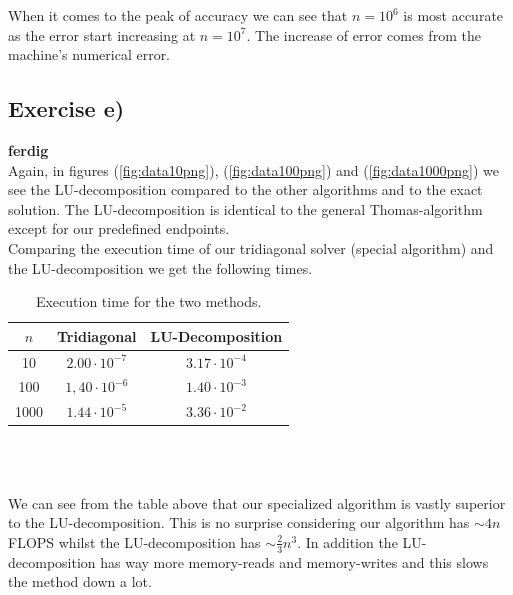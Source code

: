 \documentclass{article}
\begin{document}
  When it comes to the peak of accuracy we can see that $n=10^6$ is most accurate as the error start increasing at $n=10^7$. The increase of error comes from the machine's numerical error.

  \subsection{Exercise e)} \label{sec:Results e)}

  {\bf ferdig} \\

  Again, in figures (\ref{fig:data10png}), (\ref{fig:data100png}) and (\ref{fig:data1000png}) we see the LU-decomposition compared to the other algorithms and to the exact solution. The LU-decomposition is identical to the general Thomas-algorithm except for our predefined endpoints.\\

  Comparing the execution time of our tridiagonal solver (special algorithm) and the LU-decomposition we get the following times. \\

  \newpage

  \begin{table}[ht] \label{tab:exec_time}
    \centering
      \caption{Execution time for the two methods.}
      \vspace{2mm}
      \begin{tabular}{|c|c|c|}
        \hline
        $n$    &   Tridiagonal      &  LU-Decomposition  \\
        \hline \hline
        10   & $2.00\cdot10^{-7}$ & $3.17\cdot10^{-4}$ \\
        100  & $1,40\cdot10^{-6}$ & $1.40\cdot10^{-3}$ \\
        1000 & $1.44\cdot10^{-5}$ & $3.36\cdot10^{-2}$ \\
        \hline
      \end{tabular} \\
      \hspace{0pt}\\
  \end{table}

  We can see from the table above that our specialized algorithm is vastly superior to the LU-decomposition. This is no surprise considering our algorithm has $\sim4n$ FLOPS whilst the LU-decomposition has $\sim\frac{2}{3}n^3$. In addition the LU-decomposition has way more memory-reads and memory-writes and this slows the method down a lot. \\
\end{document}
